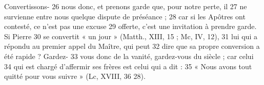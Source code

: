 Convertissons-	 
26	 	nous donc, et prenons garde que, pour notre perte, il	 
27	 	ne survienne entre nous quelque dispute de préséance ;	 
28	 	car si les Apôtres ont contesté, ce n'est pas une excuse	 
29	 	offerte, c'est une invitation à prendre garde. Si Pierre	 
30	 	se convertit « un jour » (Matth., XIII, 15 ; Mc, IV, 12),	 
31	 	lui qui a répondu au premier appel du Maître, qui peut	 
32	 	dire que sa propre conversion a été rapide ? Gardez-	 
33	 	vous donc de la vanité, gardez-vous du siècle ; car celui	 
34	 	qui est chargé d'affermir ses frères est celui qui a dit :	 
35	 	« Nous avons tout quitté pour vous suivre » (Lc, XVIII,	 
36	 	28).